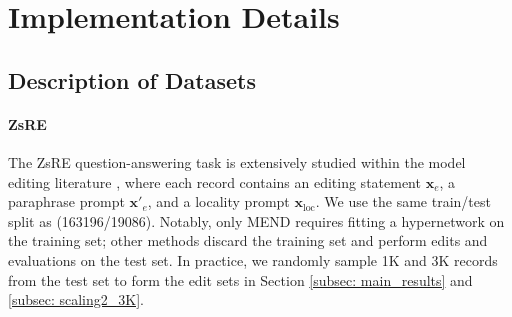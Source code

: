 \section{Implementation Details}\label{app_sec:implem_details}
\subsection{Description of Datasets}\label{app_subsec:data_description}


\begin{table}[!htbp]
\vspace{-11pt}
    \caption{Bolded text refers to the edit labels $\mathbf{y}_e$. Locality example $\mathbf{x}_{\text{loc}}$ is an unrelated query.}
    \hfill
    \label{tab:dataset-example}
    \vspace{-13pt}
\end{table}


\paragraph{ZsRE}
The ZsRE question-answering task \cite{zsre} is extensively studied within the model editing literature \cite{rome, memit, mend, malmen, t-patcher}, where each record contains an editing statement $\mathbf{x}_e$, a paraphrase prompt $\mathbf{x}'_e$, and a locality prompt $\mathbf{x}_{\text{loc}}$.
We use the same train/test split as \cite{mend} (163196/19086).
Notably, only MEND requires fitting a hypernetwork on the training set; other methods discard the training set and perform edits and evaluations on the test set. 
In practice, we randomly sample 1K and 3K records from the test set to form the edit sets in Section \ref{subsec: main_results} and \ref{subsec: scaling2_3K}.


